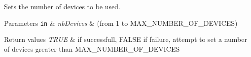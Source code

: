 Sets the number of devices to be used. 


\begin{DoxyParams}[1]{Parameters}
\mbox{\tt in}  & {\em nb\+Devices} & (from 1 to M\+A\+X\+\_\+\+N\+U\+M\+B\+E\+R\+\_\+\+O\+F\+\_\+\+D\+E\+V\+I\+C\+ES) \\
\hline
\end{DoxyParams}

\begin{DoxyRetVals}{Return values}
{\em T\+R\+UE} & if successfull, F\+A\+L\+SE if failure, attempt to set a number of devices greater than M\+A\+X\+\_\+\+N\+U\+M\+B\+E\+R\+\_\+\+O\+F\+\_\+\+D\+E\+V\+I\+C\+ES \\
\hline
\end{DoxyRetVals}
